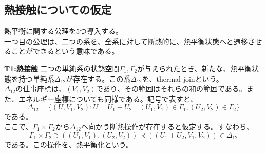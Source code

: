\documentclass[a4paper,11pt]{jsarticle}
\begin{document}
\subsection{熱接触についての仮定}
熱平衡に関する公理を5つ導入する。\\
一つ目の公理は、二つの系を、全系に対して断熱的に、熱平衡状態へと遷移させることができるという意味である。\\
\begin{itembox}[l]{\textbf{T1:熱接触}}
    二つの単純系の状態空間$\Gamma_1,\Gamma_2$が与えられたとき、新たな、熱平衡状態を持つ単純系$\Delta_{12}$が存在する。この系$\Delta_{12}$を、thermal joinという。\\
    $\Delta_{12}$の仕事座標は、$(V_1,V_2)$であり、その範囲はそれらの和の範囲である。また、エネルギー座標についても同様である。記号で表すと、
    \begin{equation}
        \Delta_{12} = \{(U,V_1,V_2):U=U_1+U_2 \quad (U_1,V_1) \in \Gamma_1,(U_2,V_2) \in \Gamma_2\}
    \end{equation}
    である。\\
    ここで、$\Gamma_1 \times \Gamma_2$から$\Delta_{12}$へ向かう断熱操作が存在すると仮定する。すなわち、
    \begin{equation}
        \Gamma_1 \times \Gamma_2 \ni ((U_1,V_1),(U_2,V_2)) \prec ((U_1+U_2,V_1,V_2)) \in \Delta_{12}
    \end{equation}
    である。この操作を、熱平衡化という。
\end{itembox}
\end{document}
